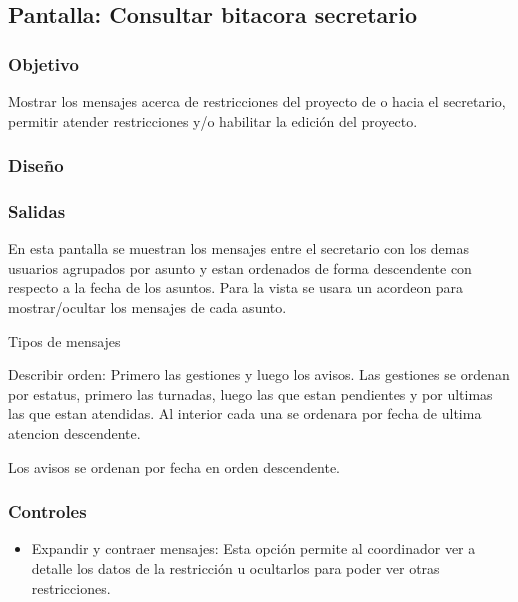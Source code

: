 \subsection{Pantalla: Consultar bitacora secretario}

\subsubsection{Objetivo}
  Mostrar los mensajes acerca de restricciones del proyecto de o hacia el secretario, permitir atender restricciones y/o habilitar la edición del proyecto.

\subsubsection{Diseño}

\subsubsection{Salidas}
  En esta pantalla se muestran los mensajes entre el secretario con los demas usuarios agrupados por asunto y estan ordenados de forma descendente con respecto a la fecha de los asuntos.
  Para la vista se usara un acordeon para mostrar/ocultar los mensajes de cada asunto.

  Tipos de mensajes
  
  Describir orden: Primero las gestiones y luego los avisos. Las gestiones se ordenan por estatus, primero las turnadas, luego las que estan pendientes y por ultimas las que estan atendidas. Al interior cada una se ordenara por fecha de ultima atencion descendente.

  Los avisos se ordenan por fecha en orden descendente.

\subsubsection{Controles}
\begin{itemize}
 \item Expandir y contraer mensajes: Esta opción permite al coordinador ver a detalle los datos de la restricción u ocultarlos para poder ver otras restricciones.
\end{itemize}

